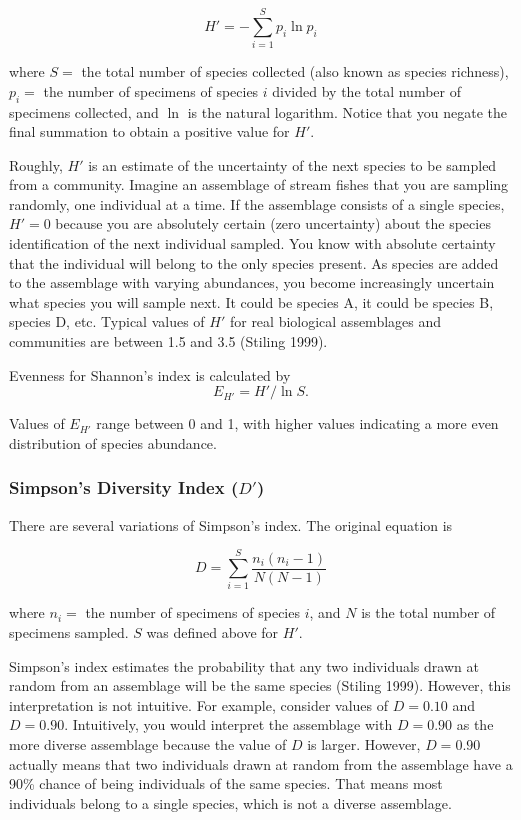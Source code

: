 \documentclass[12pt]{article}
\begin{document}
\begin{equation*}
H' = -\sum_{i=1}^{S} p_i \ln p_i
\end{equation*}

\noindent where $S = $ the total number of species collected (also known as species richness), $p_i = $ the number of specimens of species $i$ divided by the total number of specimens collected, and $\ln$ is the natural logarithm. Notice that you negate the final summation to obtain a positive value for $H'$.

Roughly, $H'$ is an estimate of the uncertainty of the next species to be sampled from a community.  Imagine an assemblage of stream fishes that you are sampling randomly, one individual at a time.  If the assemblage consists of a single species, $H' = 0$ because you are absolutely certain (zero uncertainty) about the species identification of the next individual sampled.  You know with absolute certainty that the individual will belong to the only species present.  As species are added to the assemblage with varying abundances, you become increasingly uncertain what species you will sample next.  It could be species A, it could be species B, species D, etc.  Typical values of $H'$ for real biological assemblages and communities are between 1.5 and 3.5 (Stiling 1999).

Evenness for Shannon’s index is calculated by
\begin{equation*}
E_{H'} = H'/\ln S.
\end{equation*}

Values of $E_{H' }$ range between 0 and 1, with higher values indicating a more even distribution of species abundance.

\subsubsection*{Simpson’s Diversity Index ($D'$)}

There are several variations of Simpson’s index.  The original equation is

\begin{equation*}
	D = \sum_{i=1}^{S} \frac{n_i(n_i-1)}{N(N-1)}
\end{equation*}

\noindent where $n_i = $ the number of specimens of species $i$, and $N$ is the total number of specimens sampled. $S$ was defined above for $H'$.

Simpson’s index estimates the probability that any two individuals drawn at random from an assemblage will be the same species (Stiling 1999).  However, this interpretation is not intuitive.  For example, consider values of $D = 0.10$ and $D = 0.90$.  Intuitively, you would interpret the assemblage with $D = 0.90$ as the more diverse assemblage because the value of $D$ is larger.  However, $D = 0.90$ actually means that two individuals drawn at random from the assemblage have a 90\% chance of being individuals of the same species.  That means most individuals belong to a single species, which is not a diverse assemblage.
\end{document}
